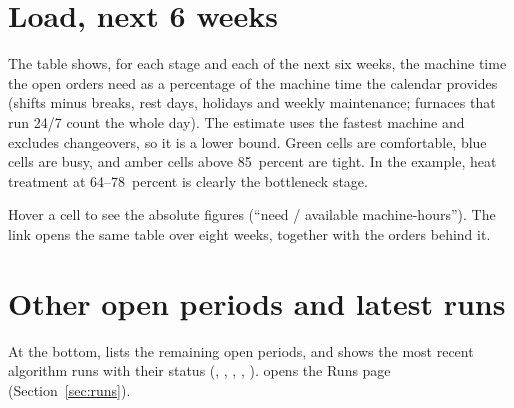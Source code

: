 \section{Load, next 6 weeks}

The table shows, for each stage and each of the next six weeks, the machine time the open orders need as a
percentage of the machine time the calendar provides (shifts minus breaks, rest days, holidays and weekly
maintenance; furnaces that run 24/7 count the whole day). The estimate uses the fastest machine and excludes
changeovers, so it is a lower bound. Green cells are comfortable, blue cells are busy, and amber cells above
85~percent are tight. In the example, heat treatment at 64--78~percent is clearly the bottleneck stage.

Hover a cell to see the absolute figures (``need / available machine-hours''). The link 
opens the same table over eight weeks, together with the orders behind it.

\section{Other open periods and latest runs}

At the bottom,  lists the remaining open periods, and  shows
the most recent algorithm runs with their status (, , , ,
).  opens the Runs page (Section~\ref{sec:runs}).
